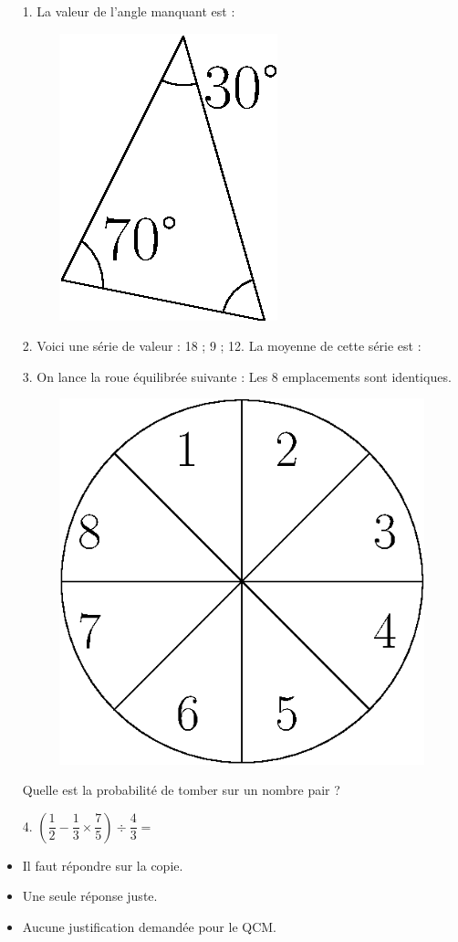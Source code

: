 \begin{multicols}{2}

    \begin{enumerate}
        \item[1.] La valeur de l’angle manquant est :
        \begin{figure}[H]
            \centering
            \includegraphics[width=0.2\linewidth]{qcm1.eps}
        \end{figure}

        \item[2.] Voici une série de valeur : 18 ; 9 ; 12. \newline 
        La moyenne de cette série est : 

        \item[3.] On lance la roue équilibrée suivante : \newline 
        Les 8 emplacements sont identiques.
        \begin{figure}[H]
            \centering
            \includegraphics[width=0.2\linewidth]{qcm3.eps}
        \end{figure}
        Quelle est la probabilité de tomber sur un nombre pair ? 
        \item[4.] $\left( \dfrac{1}{2} - \dfrac{1}{3} \times \dfrac{7}{5} \right) \div \dfrac{4}{3} = $
    \end{enumerate} \columnbreak
    
    \begin{itemize}[label={$\bullet$}]
        \item Il faut répondre sur la copie. 
        \item Une seule réponse juste.
        \item Aucune justification demandée pour le QCM.
    \end{itemize}


\end{multicols}
